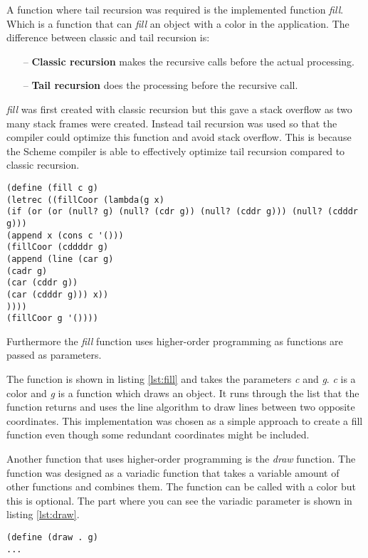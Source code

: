 A function where tail recursion was required is the implemented function \emph{fill}. Which is a function that can \emph{fill} an object with a color in the application. The difference between classic and tail recursion is:
\begin{itemize}
	\item[--] \textbf{Classic recursion} makes the recursive calls before the actual processing.
	\item[--] \textbf{Tail recursion} does the processing before the recursive call.  
\end{itemize}

\emph{fill} was first created with classic recursion but this gave a stack overflow as two many stack frames were created. Instead tail recursion was used so that the compiler could optimize this function and avoid stack overflow.  This is because the Scheme compiler is able to effectively optimize tail recursion compared to classic recursion.

\vspace{-1.4em}
\begin{lstlisting}[caption={Scheme function fill}, label=lst:fill]
(define (fill c g)
(letrec ((fillCoor (lambda(g x)
(if (or (or (null? g) (null? (cdr g)) (null? (cddr g))) (null? (cdddr g)))
(append x (cons c '()))
(fillCoor (cddddr g)
(append (line (car g)
(cadr g)
(car (cddr g))
(car (cdddr g))) x))
))))
(fillCoor g '())))
\end{lstlisting}

Furthermore the \emph{fill} function uses higher-order programming as functions are passed as parameters. 

The function is shown in listing \ref{lst:fill} and takes the parameters \emph{c} and \emph{g}. \emph{c} is a color and \emph{g} is a function which draws an object. It runs through the list that the function returns and uses the line algorithm to draw lines between two opposite coordinates. This implementation was chosen as a simple approach to create a fill function even though some redundant coordinates might be included. 

Another function that uses higher-order programming is the \emph{draw} function. The function was designed as a variadic function that takes a variable amount of other functions and combines them. The function can be called with a color but this is optional. The part where you can see the variadic parameter is shown 
in listing \ref{lst:draw}.
 
\begin{lstlisting}[caption={Example of a variadic function}, label=lst:draw]
(define (draw . g)
...
\end{lstlisting}